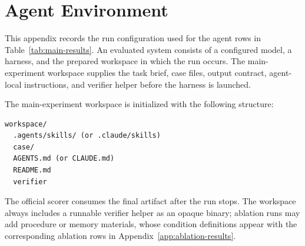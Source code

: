 \documentclass[11pt]{article}
\begin{document}
\section{Agent Environment}
\label{app:agent-workspace}

This appendix records the run configuration used for the agent rows in Table~\ref{tab:main-results}. An evaluated system consists of a configured model, a harness, and the prepared workspace in which the run occurs. The main-experiment workspace supplies the task brief, case files, output contract, agent-local instructions, and verifier helper before the harness is launched.

The main-experiment workspace is initialized with the following structure:
\begin{Verbatim}[fontsize=\scriptsize, frame=single, framesep=1mm]
workspace/
  .agents/skills/ (or .claude/skills)
  case/
  AGENTS.md (or CLAUDE.md)
  README.md
  verifier
\end{Verbatim}

The official scorer consumes the final artifact after the run stops. The workspace always includes a runnable verifier helper as an opaque binary; ablation runs may add procedure or memory materials, whose condition definitions appear with the corresponding ablation rows in Appendix~\ref{app:ablation-results}.
\end{document}
